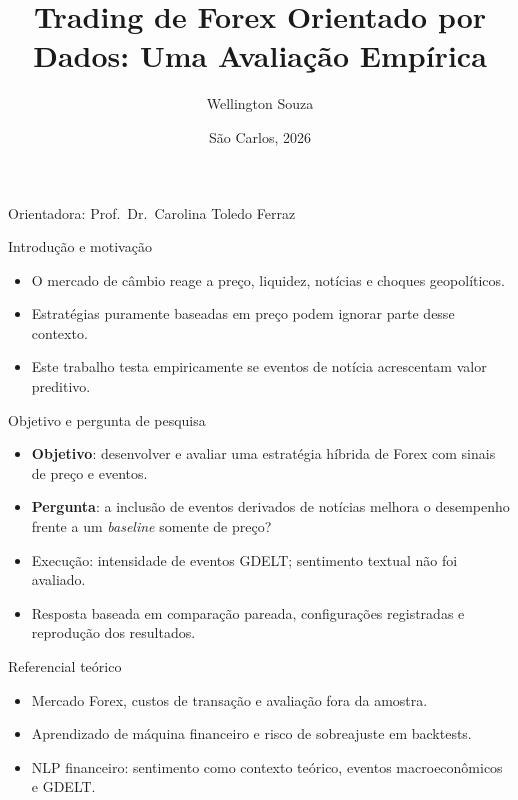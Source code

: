 \documentclass[aspectratio=169,17pt]{beamer}
\title[Trading Forex Orientado por Dados]{Trading de Forex Orientado por Dados: Uma Avaliação Empírica}
\author[Wellington Souza]{Wellington Souza}
\institute[ICMC/USP]{MBA em Intelig\^encia Artificial e Big Data \\ ICMC, Universidade de S\~ao Paulo}
\date{S\~ao Carlos, 2026}
\begin{document}
\begin{frame}
  \titlepage
  \vspace{-0.6cm}
  \begin{center}
    \small Orientadora: Prof.\ Dr.\ Carolina Toledo Ferraz
  \end{center}
\end{frame}

\begin{frame}{Introdução e motivação}
  \begin{itemize}
    \item O mercado de câmbio reage a preço, liquidez, notícias e choques geopolíticos.
    \item Estratégias puramente baseadas em preço podem ignorar parte desse contexto.
    \item Este trabalho testa empiricamente se eventos de notícia acrescentam valor preditivo.
  \end{itemize}
\end{frame}

\begin{frame}{Objetivo e pergunta de pesquisa}
  \small
  \begin{itemize}
    \item \textbf{Objetivo}: desenvolver e avaliar uma estratégia híbrida de Forex com sinais de preço e eventos.
    \item \textbf{Pergunta}: a inclusão de eventos derivados de notícias melhora o desempenho frente a um \textit{baseline} somente de preço?
    \item Execução: intensidade de eventos GDELT; sentimento textual não foi avaliado.
    \item Resposta baseada em comparação pareada, configurações registradas e reprodução dos resultados.
  \end{itemize}
\end{frame}

\begin{frame}{Referencial teórico}
  \begin{itemize}
    \item Mercado Forex, custos de transação e avaliação fora da amostra.
    \item Aprendizado de máquina financeiro e risco de sobreajuste em backtests.
    \item NLP financeiro: sentimento como contexto teórico, eventos macroeconômicos e GDELT.
  \end{itemize}
\end{frame}
\end{document}
